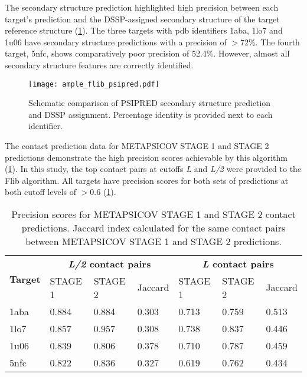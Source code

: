 The secondary structure prediction highlighted high precision between each target's prediction and the DSSP-assigned \cite{Frishman1995-ns} secondary structure of the target reference structure (\cref{fig:ample_flib_psipred}). The three targets with \gls{pdb} identifiers 1aba, 1lo7 and 1u06 have secondary structure predictions with a precision of $>72$\%. The fourth target, 5nfc, shows comparatively poor precision of 52.4\%. However, almost all secondary structure features are correctly identified.

\begin{figure}[H]
	\centering
	\texttt{[image: ample\_flib\_psipred.pdf]}
	\caption[PSIPRED schema for Flib targets]{Schematic comparison of PSIPRED \cite{Jones1999-fi} secondary structure prediction and DSSP \cite{Frishman1995-ns} assignment. Percentage identity is provided next to each identifier.}
	\label{fig:ample_flib_psipred}
\end{figure}

The contact prediction data for METAPSICOV STAGE 1 and STAGE 2 predictions demonstrate the high precision scores achievable by this algorithm (\cref{table:ample_flib_contact_precision}). In this study, the top contact pairs at cutoffs \textit{L} and \textit{L/2} were provided to the Flib algorithm. All targets have precision scores for both sets of predictions at both cutoff levels of $>0.6$ (\cref{table:ample_flib_contact_precision}).

\begin{table}[H]
  \centering
  \caption[Contact prediction summary for Flib targets]{Precision scores for METAPSICOV \cite{Jones2015-wp} STAGE 1 and STAGE 2 contact predictions. Jaccard index calculated for the same contact pairs between METAPSICOV STAGE 1 and STAGE 2 predictions.}
  \label{table:ample_flib_contact_precision}
  \begin{tabularx}{\textwidth}{X X X X X X X}
      \hline
	  \multirow{2}{*}{\textbf{Target}} & \multicolumn{3}{c}{\textbf{\textit{L/2} contact pairs}} & \multicolumn{3}{c}{\textbf{\textit{L} contact pairs}} 	\\ \cline{2-7}
	  							&  	STAGE 1	& 	STAGE 2	& 	Jaccard 	& 	STAGE 1 	& 	STAGE 2 	& 	Jaccard	 	\\
	  \hline
	  1aba						&	0.884	&	0.884	&	0.303	&	0.713	&	0.759	&	0.513		\\
	  1lo7						&	0.857	&	0.957	&	0.308	&	0.738	&	0.837	&	0.446		\\
	  1u06						&	0.839	&	0.806	&	0.378	&	0.710	&	0.787	&	0.459		\\
	  5nfc						&	0.822	&	0.836	&	0.327	&	0.619	&	0.762	&	0.434		\\ 
	  \hline
  \end{tabularx}
\end{table}

